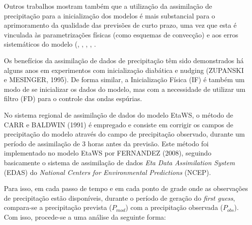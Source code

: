 Outros trabalhos mostram também que a utilização da assimilação de precipitação para a inicialização dos modelos é mais substancial para o aprimoramento da qualidade das previsões de curto prazo, uma vez que esta é vinculada às parametrizações físicas (como esquemas de convecção) e aos erros sistemáticos do modelo (\cite{kasahara1994}, \cite{mathur1995}, \cite{zupanskimesinger1995}, \cite{nunescocke2004}, \cite{messinger2005}.

Os benefícios da assimilação de dados de precipitação têm sido demonstrados há alguns anos em experimentos com inicialização diabática e nudging (ZUPANSKI e MESINGER, 1995). De forma similar, a Inicialização Física (IF) é também um modo de se inicializar os dados do modelo, mas com a necessidade de utilizar um filtro (FD) para o controle das ondas espúrias.

No sistema regional de assimilação de dados do modelo EtaWS, o método de CARR e BALDWIN (1991) é empregado e consiste em corrigir os campos de precipitação do modelo através do campo de precipitação observado, durante um período de assimilação de 3 horas antes da previsão. Este método foi implementado no modelo EtaWS por FERNANDEZ (2008), seguindo basicamente o sistema de assimilação de dados \textit{Eta Data Assimilation System} (EDAS) do \textit{National Centers for Environmental Predictions} (NCEP).

Para isso, em cada passo de tempo e em cada ponto de grade onde as observações de precipitação estão disponíveis, durante o período de geração do \textit{first guess}, compara-se a precipitação prevista ($P_{mod}$) com a precipitação observada ($P_{obs}$). Com isso, procede-se a uma análise da seguinte forma:

